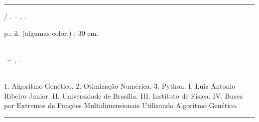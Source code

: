 \begin{fichacatalografica}
  \vspace*{\fill}                   %
  \hrule                            %
  \begin{center}                    %
    \begin{minipage}[c]{12.5cm}     %
      
      \imprimirautor
      
      \hspace{0.5cm} \imprimirtitulo  / \imprimirautor. --
      \imprimirlocal, \imprimirdata.
      
      \hspace{0.5cm} \pageref{LastPage} p.: il. (algumas color.) ; 30 cm.\\
      
      \hspace{0.5cm} \imprimirorientadorRotulo~\imprimirorientador\\
      
      \hspace{0.5cm}
      \parbox[t]{\textwidth}{\imprimirtipotrabalho~--~\imprimirinstituicao,
        \imprimirdata.}\\
      
      \hspace{0.5cm}
      1. Algoritmo Genético.
      2. Otimização Numérica.
      3. Python.
      I. Luiz Antonio Ribeiro Junior.
      II. Universidade de Brasília.
      III. Instituto de Física.
      IV. Busca por Extremos de Funções Multidimensionais Utilizando Algoritmo Genético.\\
      
      
    \end{minipage}
  \end{center}
  \hrule
\end{fichacatalografica}